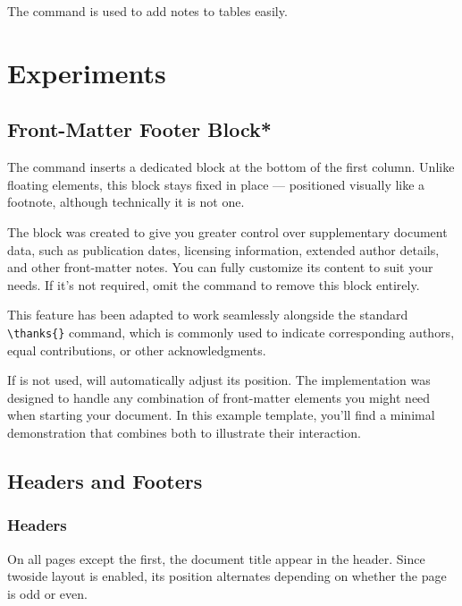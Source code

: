 \documentclass[9pt,a4paper,twocolumn,twoside]{tau-class/tau}
\begin{document}
        The \inlinecode{\tabletext{}} command is used to add notes to tables easily. 

\section{Experiments}

    \subsection{Front-Matter Footer Block*}

        The \inlinecode{\docinfo{}} command inserts a dedicated block at the bottom of the first column. Unlike floating elements, this block stays fixed in place — positioned visually like a footnote, although technically it is not one.
    
        The \inlinecode{\docinfo{}} block was created to give you greater control over supplementary document data, such as publication dates, licensing information, extended author details, and other front-matter notes. You can fully customize its content to suit your needs. If it’s not required, omit the command to remove this block entirely.
    
        \begin{note}
            This feature has been adapted to work seamlessly alongside the standard \verb|\thanks{}| command, which is commonly used to indicate corresponding authors, equal contributions, or other acknowledgments.
        \end{note}
    
        If \inlinecode{\thanks{}} is not used, \inlinecode{\docinfo{}} will automatically adjust its position. The implementation was designed to handle any combination of front-matter elements you might need when starting your document. In this example template, you’ll find a minimal demonstration that combines both to illustrate their interaction.

    \subsection{Headers and Footers}

        \subsubsection{Headers}

            On all pages except the first, the document title appear in the header. Since twoside layout is enabled, its position alternates depending on whether the page is odd or even.
\end{document}
